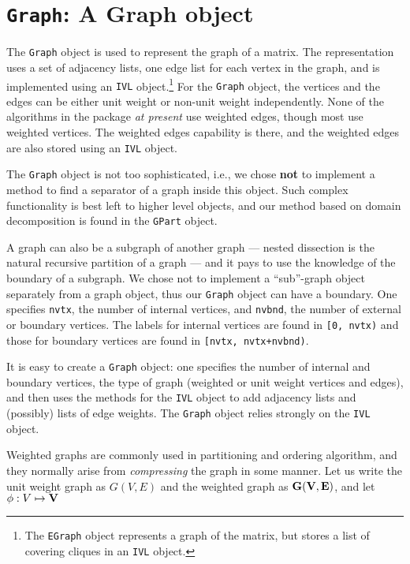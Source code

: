\par
\chapter{{\tt Graph}: A Graph object}
\label{chapter:Graph}
\par
The {\tt Graph} object is used to represent the graph of a matrix.
The representation uses a set of adjacency lists, one edge list for 
each vertex in the graph, and is implemented using an {\tt IVL}
object.\footnote{
The {\tt EGraph} object represents a graph of the matrix,
but stores a list of covering cliques in an {\tt IVL} object.
}
For the {\tt Graph} object,
the vertices and the edges can be either unit weight or non-unit
weight independently.
None of the algorithms in the package {\it at present} use weighted
edges, though most use weighted vertices.
The weighted edges capability is there, and the weighted edges are
also stored using an {\tt IVL} object.
\par
The {\tt Graph} object is not too sophisticated, i.e., we chose
{\bf not} to implement a method to find a separator of a graph 
inside this object.
Such complex functionality is best left to higher level objects,
and our method based on domain decomposition \cite{ash97-DDSEP}
is found in the {\tt GPart} object.
\par
A graph can also be a subgraph of another graph --- nested dissection
is the natural recursive partition of a graph --- and it pays to
use the knowledge of the boundary of a subgraph.
We chose not to implement a ``sub''-graph object separately from a
graph object, thus our {\tt Graph} object can have a boundary.
One specifies {\tt nvtx}, the number of internal vertices,
and {\tt nvbnd}, the number of external or boundary vertices.
The labels for internal vertices are found in {\tt [0, nvtx)}
and those for boundary vertices are found in {\tt [nvtx, nvtx+nvbnd)}.
\par
It is easy to create a {\tt Graph} object: one specifies the number
of internal and boundary vertices, the type of graph (weighted or
unit weight vertices and edges), and then uses the methods for the
{\tt IVL} object to add adjacency lists and (possibly) lists of edge
weights.
The {\tt Graph} object relies strongly on the {\tt IVL} object.
\par
Weighted graphs are commonly used in partitioning and ordering
algorithm, and they normally arise from {\it compressing} the graph
in some manner.
Let us write the unit weight graph as $G(V,E)$ and the weighted
graph as ${\bf G}({\bf V}, {\bf E})$, and let $\phi : V \mapsto {\bf V}$
